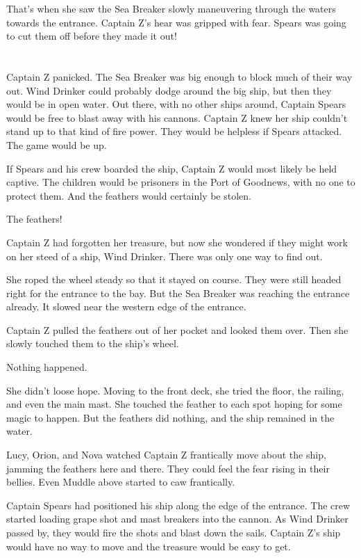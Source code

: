 \documentclass[12pt]{extbook}
\begin{document}
  That's when she saw the Sea Breaker slowly maneuvering through the
  waters towards the entrance. Captain Z's hear was gripped with fear.
  Spears was going to cut them off before they made it out!
  
  \section{}\label{section-41}
  
  Captain Z panicked. The Sea Breaker was big enough to block much of
  their way out. Wind Drinker could probably dodge around the big ship,
  but then they would be in open water. Out there, with no other ships
  around, Captain Spears would be free to blast away with his cannons.
  Captain Z knew her ship couldn't stand up to that kind of fire power.
  They would be helpless if Spears attacked. The game would be up.
  
  If Spears and his crew boarded the ship, Captain Z would most likely be
  held captive. The children would be prisoners in the Port of Goodnews,
  with no one to protect them. And the feathers would certainly be stolen.
  
  The feathers!
  
  Captain Z had forgotten her treasure, but now she wondered if they might
  work on her steed of a ship, Wind Drinker. There was only one way to
  find out.
  
  She roped the wheel steady so that it stayed on course. They were still
  headed right for the entrance to the bay. But the Sea Breaker was
  reaching the entrance already. It slowed near the western edge of the
  entrance.
  
  Captain Z pulled the feathers out of her pocket and looked them over.
  Then she slowly touched them to the ship's wheel.
  
  Nothing happened.
  
  She didn't loose hope. Moving to the front deck, she tried the floor,
  the railing, and even the main mast. She touched the feather to each
  spot hoping for some magic to happen. But the feathers did nothing, and
  the ship remained in the water.
  
  Lucy, Orion, and Nova watched Captain Z frantically move about the ship,
  jamming the feathers here and there. They could feel the fear rising in
  their bellies. Even Muddle above started to caw frantically.
  
  Captain Spears had positioned his ship along the edge of the entrance.
  The crew started loading grape shot and mast breakers into the cannon.
  As Wind Drinker passed by, they would fire the shots and blast down the
  sails. Captain Z's ship would have no way to move and the treasure would
  be easy to get.
  
\end{document}
